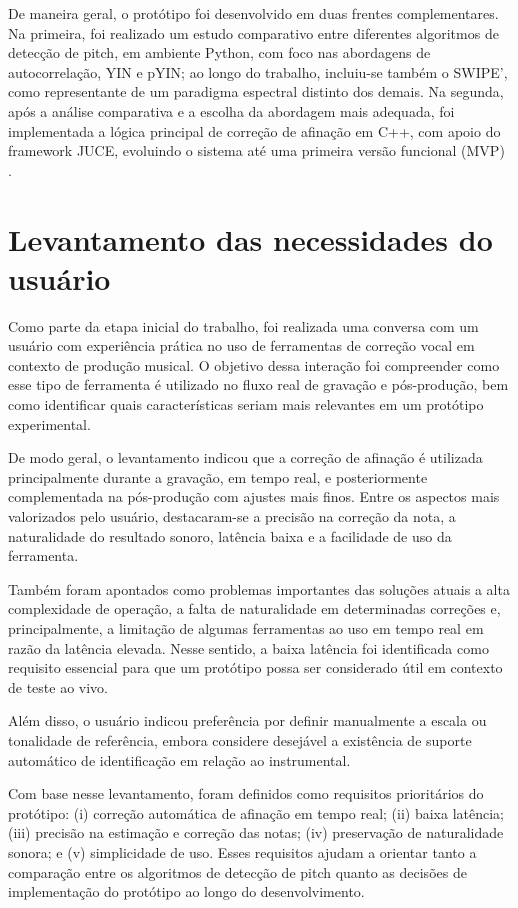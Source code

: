 De maneira geral, o protótipo foi desenvolvido em duas frentes complementares. Na primeira, foi realizado um estudo comparativo entre diferentes algoritmos de detecção de pitch, em ambiente Python, com foco nas abordagens de autocorrelação, YIN e pYIN; ao longo do trabalho, incluiu-se também o SWIPE', como representante de um paradigma espectral distinto dos demais. Na segunda, após a análise comparativa e a escolha da abordagem mais adequada, foi implementada a lógica principal de correção de afinação em C++, com apoio do framework JUCE, evoluindo o sistema até uma primeira versão funcional (MVP) \cite{delacuadra2007pitch,decheveigne2002yin, mauch2014pyin,librosa_pyin_docs, cppreference_cpp, juce_website}.

\section{Levantamento das necessidades do usuário}

Como parte da etapa inicial do trabalho, foi realizada uma conversa com um usuário com experiência prática no uso de ferramentas de correção vocal em contexto de produção musical. O objetivo dessa interação foi compreender como esse tipo de ferramenta é utilizado no fluxo real de gravação e pós-produção, bem como identificar quais características seriam mais relevantes em um protótipo experimental.

De modo geral, o levantamento indicou que a correção de afinação é utilizada principalmente durante a gravação, em tempo real, e posteriormente complementada na pós-produção com ajustes mais finos. Entre os aspectos mais valorizados pelo usuário, destacaram-se a precisão na correção da nota, a naturalidade do resultado sonoro, latência baixa e a facilidade de uso da ferramenta.

Também foram apontados como problemas importantes das soluções atuais a alta complexidade de operação, a falta de naturalidade em determinadas correções e, principalmente, a limitação de algumas ferramentas ao uso em tempo real em razão da latência elevada. Nesse sentido, a baixa latência foi identificada como requisito essencial para que um protótipo possa ser considerado útil em contexto de teste ao vivo.

Além disso, o usuário indicou preferência por definir manualmente a escala ou tonalidade de referência, embora considere desejável a existência de suporte automático de identificação em relação ao instrumental. 

Com base nesse levantamento, foram definidos como requisitos prioritários do protótipo: (i) correção automática de afinação em tempo real; (ii) baixa latência; (iii) precisão na estimação e correção das notas; (iv) preservação de naturalidade sonora; e (v) simplicidade de uso. Esses requisitos ajudam a orientar tanto a comparação entre os algoritmos de detecção de pitch quanto as decisões de implementação do protótipo ao longo do desenvolvimento.

